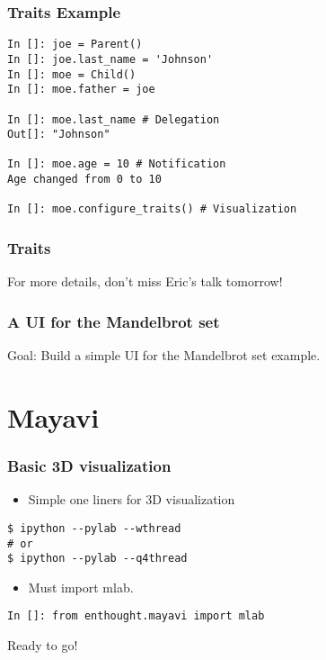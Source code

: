 \documentclass[14pt,compress]{beamer}
\begin{document}
\begin{frame}
  \frametitle{Traits Example}
\vspace*{-6pt}
\small
\begin{lstlisting}
In []: joe = Parent()
In []: joe.last_name = 'Johnson'
In []: moe = Child()
In []: moe.father = joe

In []: moe.last_name # Delegation
Out[]: "Johnson"

In []: moe.age = 10 # Notification
Age changed from 0 to 10

In []: moe.configure_traits() # Visualization
\end{lstlisting}
\end{frame}

\begin{frame}
  \frametitle{Traits}

  \begin{center}
  \alert{For more details, don't miss Eric's talk tomorrow!}
  \end{center}

\end{frame}

\begin{frame}
  \frametitle{A UI for the Mandelbrot set}
\begin{center}
    Goal: Build a simple UI for the Mandelbrot set example.
\end{center}
\end{frame}




\section{Mayavi}

\begin{frame}[fragile]
\frametitle{Basic 3D visualization}
\begin{itemize}
    \item Simple one liners for 3D visualization
\end{itemize}
  \begin{lstlisting}
$ ipython --pylab --wthread
# or
$ ipython --pylab --q4thread
  \end{lstlisting}
\begin{itemize}
    \item Must import mlab.
\end{itemize}
\begin{lstlisting}
In []: from enthought.mayavi import mlab
\end{lstlisting}
Ready to go!
\end{frame}
\end{document}
